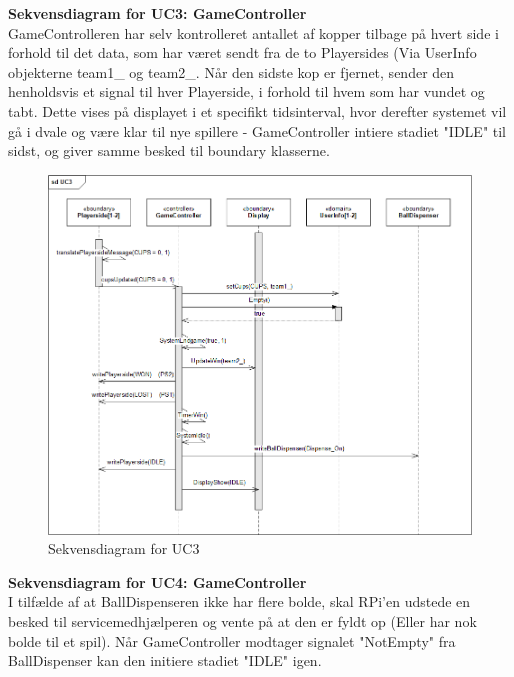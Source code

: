 \documentclass[Arkitektur/System_main.tex]{subfiles}
\begin{document}
\newpage
\textbf{Sekvensdiagram for UC3: GameController}\\
GameControlleren har selv kontrolleret antallet af kopper tilbage på hvert side i forhold til det data, som har været sendt fra de to Playersides (Via UserInfo objekterne team1\_ og team2\_. Når den sidste kop er fjernet, sender den henholdsvis et signal til hver Playerside, i forhold til hvem som har vundet og tabt. Dette vises på displayet i et specifikt tidsinterval, hvor derefter systemet vil gå i dvale og være klar til nye spillere - GameController intiere stadiet "IDLE" til sidst, og giver samme besked til boundary klasserne. 

\begin{figure}[H]
    \centering
    \includegraphics[width=\textwidth]{Arkitektur/Softwarearkitektur/Applikationsmodel/RPi/graphics_RPi/UC3_SD.png}
   \caption{Sekvensdiagram for UC3}
    \label{fig:UC3_SD_RPi}
\end{figure}

\newpage
\textbf{Sekvensdiagram for UC4: GameController}\\
I tilfælde af at BallDispenseren ikke har flere bolde, skal RPi'en udstede en besked til servicemedhjælperen og vente på at den er fyldt op (Eller har nok bolde til et spil). Når GameController modtager signalet "NotEmpty" fra BallDispenser kan den initiere stadiet "IDLE" igen. 
\end{document}
